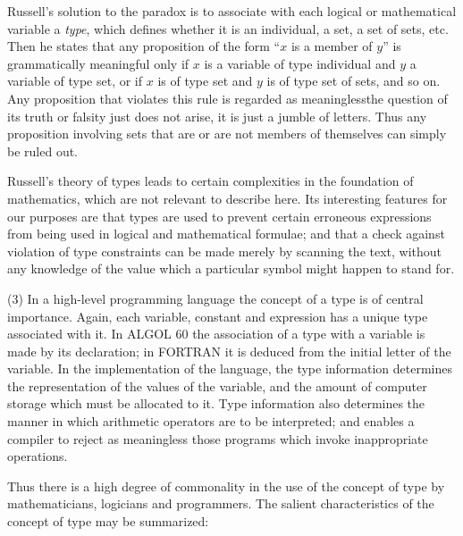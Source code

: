 \documentclass[twoside,11pt]{book}
\begin{document}
Russell's solution to the paradox is to associate with each logical or mathematical variable a \textit{type}, which defines whether it is an individual, a set, a set of sets, etc. Then he states that any proposition of the form ``$x$ is a member of $y$'' is grammatically meaningful only if $x$ is a variable of type individual and $y$ a variable of type set, or if $x$ is of type set and $y$ is of type set of sets, and so on. Any proposition that violates this rule is regarded as meaningless\textemdash{}the question of its truth or falsity just does not arise, it is just a jumble of letters. Thus any proposition involving sets that are or are not members of themselves can simply be ruled out.

Russell's theory of types leads to certain complexities in the foundation of mathematics, which are not relevant to describe here. Its interesting features for our purposes are that types are used to prevent certain erroneous expressions from being used in logical and mathematical formulae; and that a check against violation of type constraints can be made merely by scanning the text, without any knowledge of the value which a particular symbol might happen to stand for.

(3) In a high-level programming language the concept of a type is of central importance. Again, each variable, constant and expression has a unique type associated with it. In ALGOL 60 the association of a type with a variable is made by its declaration; in FORTRAN it is deduced from the initial letter of the variable. In the implementation of the language, the type information determines the representation of the values of the variable, and the amount of computer storage which must be allocated to it. Type information also determines the manner in which arithmetic operators are to be interpreted; and enables a compiler to reject as meaningless those programs which invoke inappropriate operations.

Thus there is a high degree of commonality in the use of the concept of type by mathematicians, logicians and programmers. The salient characteristics of the concept of type may be summarized:
\end{document}
